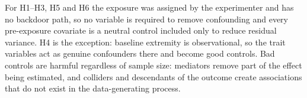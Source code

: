 \begin{table}[!h]
\begin{threeparttable}
\begin{tablenotes}
\item For H1--H3, H5 and H6 the exposure was assigned by the experimenter and has no backdoor path, so no variable is required to remove confounding and every pre-exposure covariate is a neutral control included only to reduce residual variance. H4 is the exception: baseline extremity is observational, so the trait variables act as genuine confounders there and become good controls. Bad controls are harmful regardless of sample size: mediators remove part of the effect being estimated, and colliders and descendants of the outcome create associations that do not exist in the data-generating process.
\end{tablenotes}
\end{threeparttable}
\end{table}
